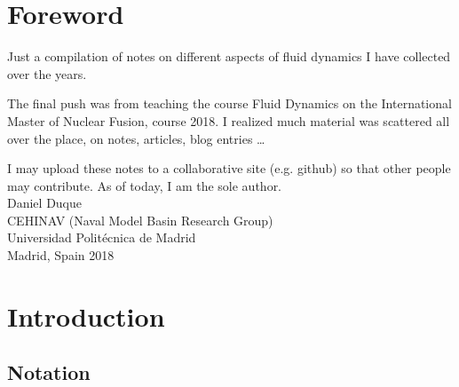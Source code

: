 \chapter*{Foreword}



Just a compilation of notes on different aspects of fluid
dynamics I have collected over the years.

The final push was from teaching the course Fluid Dynamics on the
International Master of Nuclear Fusion, course 2018. I realized much
material was scattered all over the place, on notes, articles, blog
entries \ldots

I may upload these notes to a collaborative site (e.g. github) so that
other people may contribute. As of today, I am the sole author.\\[4cm]

Daniel Duque \\
CEHINAV (Naval Model Basin Research Group) \\
Universidad Polit\'ecnica de Madrid \\
Madrid, Spain 2018




\chapter{Introduction}



\section{Notation}


